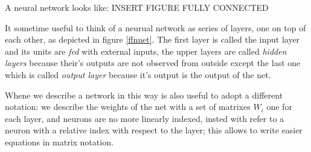 A neural network looks like:
INSERT FIGURE FULLY CONNECTED

It sometime useful to think of a neurual network as series of layers, one on top of each other, as depicted in figure \ref{ffnnet}. The first layer is called the input layer and its units are \textit{fed}
with external inputs, the upper layers are called \textit{hidden layers} because their's outputs are not observed from outside except the last one which is called \textit{output layer} because it's output 
is the output of the net.

Whene we describe a network in this way is also useful to adopt a different notation: we describe the weights of the net with a set of matrixes $W_i$ one for each layer, and neurons are no more
linearly indexed, insted with refer to a neuron with a relative index with respect to the layer; this allows to write easier equations in matrix notation.


